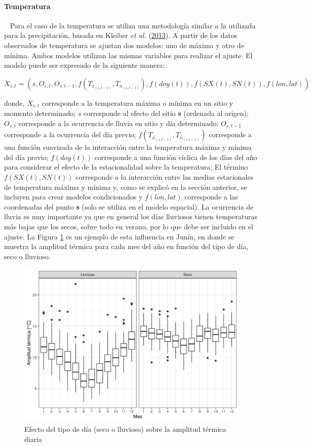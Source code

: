 \documentclass[
  12pt]{article}
\begin{document}
\hypertarget{temperatura}{%
\paragraph{Temperatura}\label{temperatura}}

~
Para el caso de la temperatura se utiliza una metodología similar a la utilizada para la precipitación, basada en Kleiber \emph{et al.} (\protect\hyperlink{ref-RN3538}{2013}). A partir de los datos observados de temperatura se ajustan dos modelos: uno de máxima y otro de mínima. Ambos modelos utilizan las mismas variables para realizar el ajuste. El modelo puede ser expresado de la siguiente manera:

\[
X_{s,t} = (s,  O_{s,t}, O_{s,t-1}, f(T_{x_{(s, t-1)}}, T_{n_{(s, t-1)}}), f(doy(t)), f(SX(t), SN(t)), f(lon, lat))
\]

donde, \(X_{s,t}\) corresponde a la temperatura máxima o mínima en un sitio y momento determinado; \(s\) corresponde al efecto del sitio \textbf{s} (ordenada al origen); \(O_{s,t}\) corresponde a la ocurrencia de lluvia en sitio y día determinado; \(O_{s,t-1}\) corresponde a la ocurrencia del día previo; \(f(T_{x_{(s, t-1)}}, T_{n_{(s, t-1)}})\) corresponde a una función suavizada de la interacción entre la temperatura máxima y mínima del día previo; \(f(doy(t))\) corresponde a una función cíclica de los días del año para considerar el efecto de la estacionalidad sobre la temperatura; El término \(f(SX(t), SN(t))\) corresponde a la interacción entre las medias estacionales de temperatura máxima y mínima y, como se explicó en la sección anterior, se incluyen para crear modelos condicionados y \(f(lon, lat)\) corresponde a las coordenadas del punto \textbf{s} (solo se utiliza en el modelo espacial).
La ocurrencia de lluvia es muy importante ya que en general los días lluviosos tienen temperaturas más bajas que los secos, sobre todo en verano, por lo que debe ser incluido en el ajuste. La Figura \ref{fig:efecto-tipo-dia-lluvioso} es un ejemplo de esta influencia en Junín, en donde se muestra la amplitud térmica para cada mes del año en función del tipo de día, seco o lluvioso.

\begin{figure}[H]

{\centering \includegraphics[width=0.7\linewidth]{./docs/figures/efecto_tipo-dia-lluvioso} 

}

\caption{Efecto del tipo de día (seco o lluvioso) sobre la amplitud térmica diaria}\label{fig:efecto-tipo-dia-lluvioso}
\end{figure}
\end{document}
